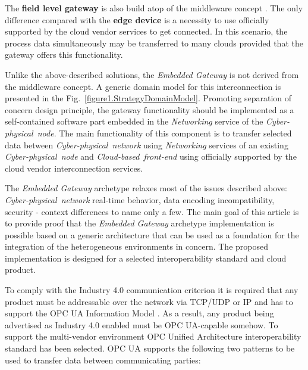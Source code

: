\documentclass[runningheads]{llncs}
\begin{document}
The \textbf{field level gateway} is also build atop of the middleware concept \cite{Sunyaev2020}. The only difference compared with the \textbf{edge device} is a necessity to use officially supported by the cloud vendor services to get connected. In this scenario, the process data simultaneously may be transferred to many clouds provided that the gateway offers this functionality.

\begin{proposition}
      Unlike the above-described solutions, the \emph{Embedded Gateway} is not derived from the middleware concept. A generic domain model for this interconnection is presented in the Fig.~\ref{figure1.StrategyDomainModel}. Promoting separation of concern design principle, the gateway functionality should be implemented as a self-contained software part embedded in the \emph{Networking} service of the \emph{Cyber-physical\ node}. The main functionality of this component is to transfer selected data between \emph{Cyber-physical\ network} using \emph{Networking} services of an existing \emph{Cyber-physical\ node} and \emph{Cloud-based\ front-end} using officially supported by the cloud vendor interconnection services.
\end{proposition}

The \emph{Embedded Gateway} archetype relaxes most of the issues described above: \emph{Cyber-physical\ network} real-time behavior, data encoding incompatibility, security - context differences to name only a few. The main goal of this article is to provide proof that the \emph{Embedded Gateway} archetype implementation is possible based on a generic architecture that can be used as a foundation for the integration of the heterogeneous environments in concern. The proposed implementation is designed for a selected interoperability standard and cloud product.

To comply with the Industry 4.0 communication criterion it is required that any product must be addressable over the network via TCP/UDP \cite{RefWorks:doc:5d8e1874e4b0bc72a68f0d11} or IP \cite{RefWorks:doc:5ac86c98e4b009947bbb8730} and has to support the OPC UA Information Model \cite{OPCUAPart5, RefWorks:doc:5ac86c99e4b009947bbb87c9, RefWorks:doc:5d986a28e4b0b0c862c0d184}. As a result, any product being advertised as Industry 4.0 enabled must be OPC UA-capable somehow. To support the multi-vendor environment OPC Unified Architecture interoperability standard has been selected. OPC UA supports the following two patterns to be used to transfer data between communicating parties:
\end{document}
